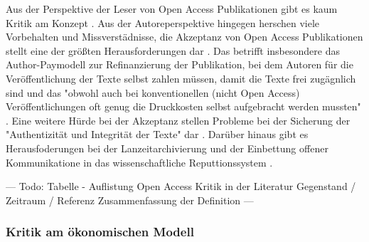 Aus der Perspektive der Leser von Open Access Publikationen gibt es kaum Kritik am Konzept \cite{weishaupt_2009_goldenOA}. Aus der Autoreperspektive hingegen herschen viele Vorbehalten und Missverstädnisse, die Akzeptanz von Open Access Publikationen stellt eine der größten Herausforderungen dar \cite{weishaupt_2009_goldenOA} \cite{Suber_2002}. Das betrifft insbesondere das Author-Paymodell zur Refinanzierung der Publikation, bei dem Autoren für die Veröffentlichung der Texte selbst zahlen müssen, damit die Texte frei zugägnlich sind \cite{suchen} und das "obwohl auch bei konventionellen (nicht Open Access) Veröffentlichungen oft genug die Druckkosten selbst aufgebracht werden mussten" \cite{weishaupt_2009_goldenOA}. Eine weitere Hürde bei der Akzeptanz stellen Probleme bei der Sicherung der "Authentizität und Integrität der Texte" dar \cite{weishaupt_2009_goldenOA}. Darüber hinaus gibt es Herausfoderungen bei der Lanzeitarchivierung und der Einbettung offener Kommunikatione in das wissenschaftliche Reputtionssystem \cite{weishaupt_2009_goldenOA} \cite{Suber_2002} \cite{Adema_2014_open_access}.

--- Todo: Tabelle - Auflistung Open Access Kritik in der Literatur  
Gegenstand / Zeitraum / Referenz
Zusammenfassung der Definition --- 

\subsubsection{Kritik am ökonomischen Modell}

